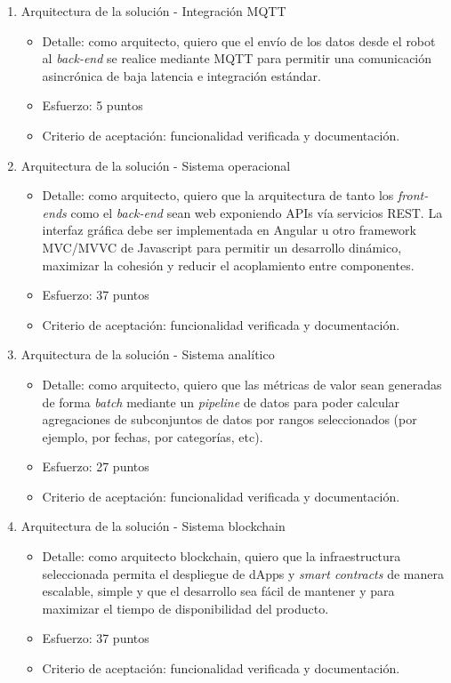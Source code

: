 \documentclass[
11pt, %
]{charter}
\begin{document}
\begin{enumerate}

	\item Arquitectura de la solución - Integración MQTT
	\begin{itemize}
		\item Detalle: como arquitecto, quiero que el envío de los datos desde el robot al \textit{back-end} se realice mediante MQTT para permitir una comunicación asincrónica de baja latencia e integración estándar.
		\item Esfuerzo: 5 puntos
		\item Criterio de aceptación: funcionalidad verificada y documentación.
	\end{itemize}


	\item Arquitectura de la solución - Sistema operacional
	\begin{itemize}
		\item Detalle: como arquitecto, quiero que la arquitectura de tanto los \textit{front-ends} como el \textit{back-end} sean web exponiendo APIs vía servicios REST. La interfaz gráfica debe ser implementada en Angular u otro framework MVC/MVVC de Javascript para permitir un desarrollo dinámico, maximizar la cohesión y reducir el acoplamiento entre componentes.
		\item Esfuerzo: 37 puntos
		\item Criterio de aceptación: funcionalidad verificada y documentación.
	\end{itemize}

	\item Arquitectura de la solución - Sistema analítico
	\begin{itemize}
		\item Detalle: como arquitecto, quiero que las métricas de valor sean generadas de forma \textit{batch} mediante un \textit{pipeline} de datos para poder calcular agregaciones de subconjuntos de datos por rangos seleccionados (por ejemplo, por fechas, por categorías, etc).
		\item Esfuerzo: 27 puntos
		\item Criterio de aceptación: funcionalidad verificada y documentación.
	\end{itemize}

	\item Arquitectura de la solución - Sistema blockchain
	\begin{itemize}
		\item Detalle: como arquitecto blockchain, quiero que la infraestructura seleccionada permita el despliegue de dApps y \textit{smart contracts} de manera escalable, simple y que el desarrollo sea fácil de mantener y para maximizar el tiempo de disponibilidad del producto.
		\item Esfuerzo: 37 puntos
		\item Criterio de aceptación: funcionalidad verificada y documentación.
	\end{itemize}


\end{enumerate}
\end{document}
